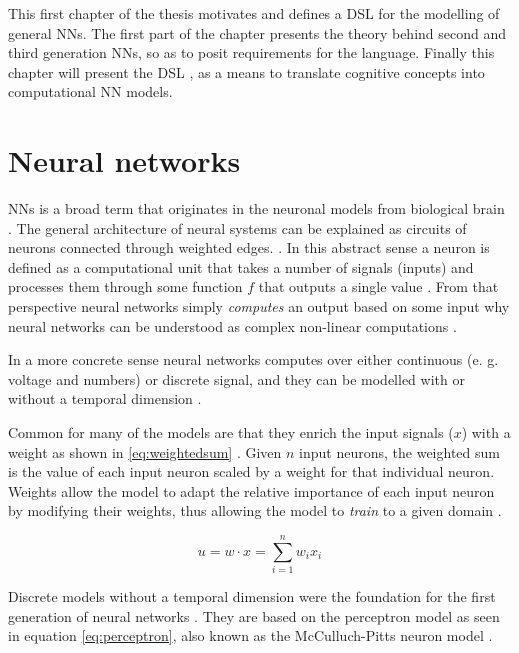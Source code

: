 \documentclass[report.tex]{subfiles}
\begin{document}
This first chapter of the thesis motivates and defines
a \gls{DSL} for the modelling of general \gls{NN}s.
The first part of the chapter presents the theory behind second and third
generation \gls{NN}s, so as to posit requirements for the language. 
Finally this chapter will present the \gls{DSL} ,
as a means to translate cognitive concepts into computational \gls{NN}
models.

\section{Neural networks}
\Gls{NN}s is a broad term that originates in the neuronal models from
biological brain \cite{Dayan2001}.
The general architecture of neural systems can be explained as circuits
of neurons  connected through weighted edges.
\cite{Russel2007, Dayan2001}.
In this abstract sense a neuron is defined as a computational unit that
takes a number of signals (inputs) and processes them through some
function $f$ that outputs a single value \cite{Eliasmith2004}.
From that perspective neural networks simply \textit{computes} an 
output based on some input why neural networks can be understood as
complex non-linear computations \cite{Eliasmith2004, Dayan2001}.

In a more concrete sense neural networks computes over either
continuous (e. g. voltage and numbers) or discrete signal, and they
can be modelled with or without a temporal dimension
\cite{Eliasmith2004, Russel2007, Schmidhuber2014}.

Common for many of the models are that they enrich the
input signals ($x$) with a weight as shown in \ref{eq:weightedsum}
\cite{Schmidhuber2014, Russel2007}. 
Given $n$ input neurons, the weighted sum is the value of each
input neuron scaled by a weight for that individual neuron.
Weights allow the model to adapt the relative importance of each
input neuron by modifying their weights, thus allowing the
model to \textit{train} to a given domain \cite{Schmidhuber2014, Russel2007}.

\begin{equation} \label{eq:weightedsum}
u = w \cdot x = \sum_{i=1}^n w_i x_i
\end{equation}

Discrete models without a temporal dimension were the foundation for
the first generation of neural networks \cite{Russel2007, Maass1997}.
They are based on the perceptron model as seen in equation
\ref{eq:perceptron}, also known as the McCulluch-Pitts neuron model
\cite{Eliasmith2004}.
\end{document}
